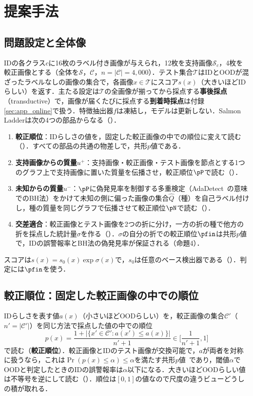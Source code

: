 \section{提案手法}
\label{sec:method}
\subsection{問題設定と全体像}
IDの各クラス$c$に16枚のラベル付き画像が与えられ，12枚を支持画像$\mathcal{S}_c$，4枚を較正画像とする（全体を$\mathcal{S}$，$\mathcal{C}$，$n=|\mathcal{C}|=4{,}000$）．テスト集合$\mathcal{T}$はIDとOODが混ざったラベルなしの画像の集合で，各画像$x\in\mathcal{T}$にスコア$s(x)$（大きいほどIDらしい）を返す．主たる設定は$\mathcal{T}$の全画像が揃ってから採点する\textbf{事後採点}（transductive）で，画像が届くたびに採点する\textbf{到着時採点}は付録\ref{sec:app_online}で扱う．特徴抽出器$f$は凍結し，モデルは更新しない．Salmon Ladderは次の4つの部品からなる（）．
\begin{enumerate}
\setlength{\itemsep}{0pt}
\item \textbf{較正順位}：IDらしさの値を，固定した較正画像の中での順位に変えて読む（）．すべての部品の共通の物差しで，共形$p$値である．
\item \textbf{支持画像からの質量$u^{+}$}：支持画像・較正画像・テスト画像を節点とする1つのグラフ上で支持画像に置いた質量を伝播させ，較正順位$\pP$で読む（）．
\item \textbf{未知からの質量$u^{-}$}：$\pP$に偽発見率を制御する多重検定（AdaDetect~\cite{marandon2024adadetect}の意味でのBH法）をかけて未知の側に偏った画像の集合$\hat{Q}$（種）を自己ラベル付けし，種の質量を同じグラフで伝播させて較正順位$\pN$で読む（）．
\item \textbf{交差適合}：較正画像とテスト画像を2つの折に分け，一方の折の種で他方の折を採点した統計量$\sigma$を作る（）．$\sigma$の自分の折での較正順位$\pfin$は共形$p$値で，IDの誤警報率とBH法の偽発見率が保証される（命題4）．
\end{enumerate}
スコアは$s(x)=s_0(x)\exp\sigma(x)$で，$s_0$は任意のベース検出器である（）．判定には$\pfin$を使う．

\subsection{較正順位：固定した較正画像の中での順位}
\label{sec:rank}
IDらしさを表す値$a(x)$（小さいほどOODらしい）を，較正画像の集合$\mathcal{C}'$（$n'=|\mathcal{C}'|$）を同じ方法で採点した値の中での順位
\begin{equation}
p(x)=\frac{1+|\{x'\in\mathcal{C}':a(x')\le a(x)\}|}{n'+1}\in\Big[\frac{1}{n'+1},1\Big]
\label{eq:rank}
\end{equation}
で読む（\textbf{較正順位}）．較正画像とIDのテスト画像が交換可能で，$a$が両者を対称に扱うなら，これは$\Pr(p(x)\le\alpha)\le\alpha$を満たす共形$p$値~\cite{bates2023conformal,marandon2024adadetect}であり，閾値$\alpha$でOODと判定したときのIDの誤警報率は$\alpha$以下になる．大きいほどOODらしい値は不等号を逆にして読む（）．順位は$[0,1]$の値なので尺度の違うビューどうしの積が取れる．

